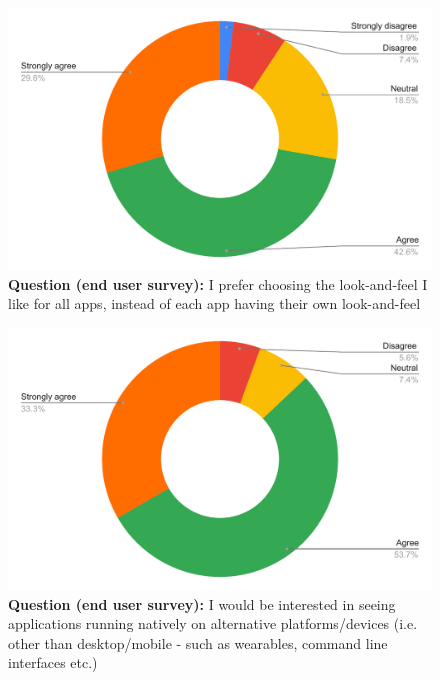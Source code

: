 \begin{figure}[H]
  \centering
  \includegraphics[width=13cm]{thesis/paper/images/p2u_q8.pdf}
  \textbf{Question (end user survey):} I prefer choosing the look-and-feel I like for all apps, instead of each app having their own look-and-feel
\end{figure}

\begin{figure}[H]
  \centering
  \includegraphics[width=13cm]{thesis/paper/images/p2u_q9.pdf}
  \textbf{Question (end user survey):} I would be interested in seeing applications running natively on alternative platforms/devices (i.e. other than desktop/mobile - such as wearables, command line interfaces etc.)
\end{figure}

